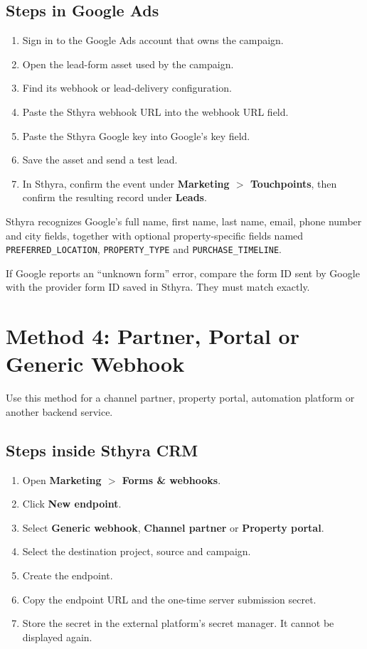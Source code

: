 \documentclass[11pt,a4paper]{article}
\newcommand{\menu}[1]{\textbf{#1}}
\newcommand{\code}[1]{\texttt{#1}}
\begin{document}
\subsection{Steps in Google Ads}

\begin{enumerate}
  \item Sign in to the Google Ads account that owns the campaign.
  \item Open the lead-form asset used by the campaign.
  \item Find its webhook or lead-delivery configuration.
  \item Paste the Sthyra webhook URL into the webhook URL field.
  \item Paste the Sthyra Google key into Google's key field.
  \item Save the asset and send a test lead.
  \item In Sthyra, confirm the event under \menu{Marketing $>$ Touchpoints}, then confirm the resulting record under \menu{Leads}.
\end{enumerate}

Sthyra recognizes Google's full name, first name, last name, email, phone number and city fields, together with optional property-specific fields named \code{PREFERRED\_LOCATION}, \code{PROPERTY\_TYPE} and \code{PURCHASE\_TIMELINE}.

If Google reports an ``unknown form'' error, compare the form ID sent by Google with the provider form ID saved in Sthyra. They must match exactly.

\section{Method 4: Partner, Portal or Generic Webhook}

Use this method for a channel partner, property portal, automation platform or another backend service.

\subsection{Steps inside Sthyra CRM}

\begin{enumerate}
  \item Open \menu{Marketing $>$ Forms \& webhooks}.
  \item Click \menu{New endpoint}.
  \item Select \menu{Generic webhook}, \menu{Channel partner} or \menu{Property portal}.
  \item Select the destination project, source and campaign.
  \item Create the endpoint.
  \item Copy the endpoint URL and the one-time server submission secret.
  \item Store the secret in the external platform's secret manager. It cannot be displayed again.
\end{enumerate}
\end{document}

